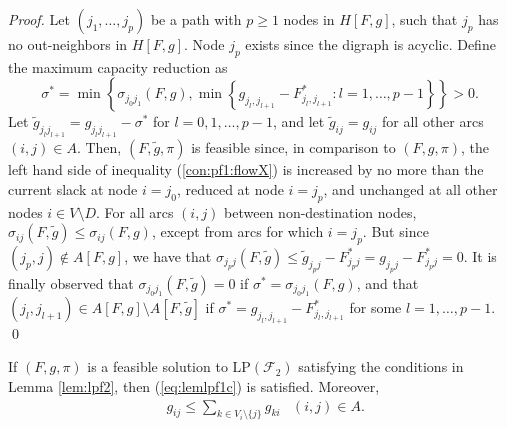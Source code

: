 \begin{proof}
Let $(j_1,\ldots,j_p)$ be a path with $p\geq 1$ nodes in $H[F,g]$, such that $j_p$ has no out-neighbors in $H[F,g]$.
Node $j_p$ exists since the digraph is acyclic.
Define the maximum capacity reduction as
\[ \sigma^*=\min\left\{\sigma_{j_0j_1}(F,g),\min\left\{g_{j_l,j_{l+1}}-F^*_{j_l,j_{l+1}}: l=1,\ldots,p-1\right\}\right\}>0.\]
Let $\tilde{g}_{j_lj_{l+1}}=g_{j_lj_{l+1}}-\sigma^*$ for $l=0,1,\ldots,p-1$, and let $\tilde{g}_{ij}=g_{ij}$ for all other arcs $(i,j)\in A$.
Then, $(F,\tilde{g},\pi)$ is feasible since, in comparison to $(F,g,\pi)$,  the left hand side of inequality (\ref{con:pf1:flowX}) is
increased by no more than the current slack at node $i=j_0$, reduced at node $i=j_p$, and unchanged at all other nodes $i\in V\setminus D$.
For all arcs $(i,j)$ between non-destination nodes, $\sigma_{ij}(F,\tilde{g})\leq\sigma_{ij}(F,g)$, except from arcs for which $i=j_p$.
But since $(j_p,j)\not\in A[F,g]$, we have that $\sigma_{j_pj}(F,\tilde{g})\leq\tilde{g}_{j_pj}-F^*_{j_pj}=g_{j_pj}-F^*_{j_pj}=0$.
It is finally observed that $\sigma_{j_0j_1}(F,\tilde{g})=0$ if $\sigma^*=\sigma_{j_0j_1}(F,g)$,
and that $\left(j_l,j_{l+1}\right)\in A[F,g]\setminus A[F,\tilde{g}]$ if $\sigma^*=g_{j_l,j_{l+1}}-F^*_{j_l,j_{l+1}}$ for some $l=1,\ldots,p-1$.
\qed\end{proof}

\begin{lemma} \label{lem:lpf2gijgji}
If $(F,g,\pi)$ is a feasible solution to $\text{LP}(\mathcal{F}_2)$ satisfying the conditions in Lemma \ref{lem:lpf2}, then (\ref{eq:lemlpf1c}) is satisfied.
Moreover,
\begin{equation}
\begin{aligned}
 & g_{ij} \leq \sum_{k\in V_i\setminus\{j\}}g_{ki} & (i,j)\in A. \label{eq:lemlpf2d}
\end{aligned}
\end{equation}
\end{lemma}

